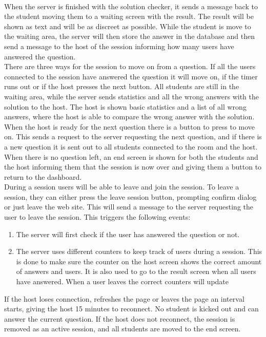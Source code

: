 \\[11pt]
When the server is finished with the solution checker, it sends a message back to the student moving them to a waiting screen with the result. The result will be shown as text and will be as discreet as possible. While the student is move to the waiting area, the server will then store the answer in the database and then send a message to the host of the session informing how many users have answered the question.
\\[11pt]
There are three ways for the session to move on from a question. If all the users connected to the session have answered the question it will move on, if the timer runs out or if the host presses the next button. All students are still in the waiting area, while the server sends statistics and all the wrong answers with the solution to the host. The host is shown basic statistics and a list of all wrong answers, where the host is able to compare the wrong answer with the solution. When the host is ready for the next question there is a button to press to move on. This sends a request to the server requesting the next question, and if there is a new question it is sent out to all students connected to the room and the host. When there is no question left, an end screen is shown for both the students and the host informing them that the session is now over and giving them a button to return to the dashboard.
\\[11pt]
During a session users will be able to leave and join the session. To leave a session, they can either press the leave session button, prompting confirm dialog or just leave the web site. This will send a message to the server requesting the user to leave the session. This triggers the following events:
\begin{enumerate}
	\item The server will first check if the user has answered the question or not. 
	\item The server uses different counters to keep track of users during a session. This is done to make sure the counter on the host screen shows the correct amount of answers and users. It is also used to go to the result screen when all users have answered. When a user leaves the correct counters will update
\end{enumerate}
If the host loses connection, refreshes the page or leaves the page an interval starts, giving the host 15 minutes to reconnect. No student is kicked out and can answer the current question. If the host does not reconnect, the session is removed as an active session, and all students are moved to the end screen.
